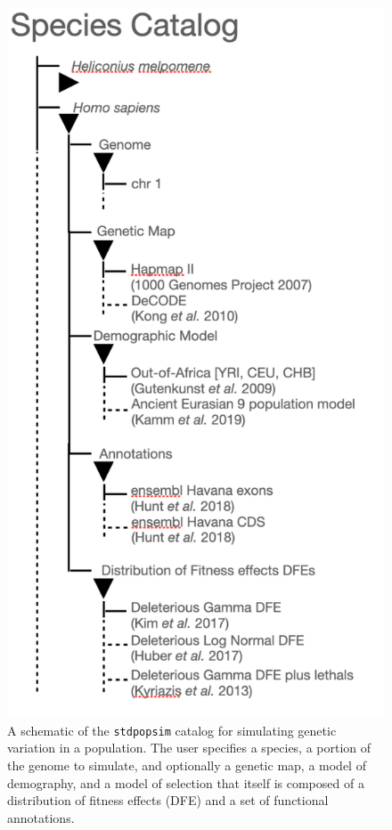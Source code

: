 \documentclass[hidelinks]{article}
\newcommand{\stdpopsim}{\texttt{stdpopsim}\xspace}
\begin{document}
    \begin{figure}
        \vspace{-0.0cm}
        \includegraphics[width=\linewidth]{figures/schematics/catalog.pdf}
        \caption{\label{fig:schematic}
        A schematic of the \stdpopsim catalog for simulating genetic variation
        in a population. The user specifies a species, a portion of the genome to simulate,
        and optionally a genetic map, a model of demography, and a model of selection that 
        itself is composed of a distribution of fitness effects (DFE) and a set of functional
        annotations.}
    \end{figure}
    \hfill
\end{document}
